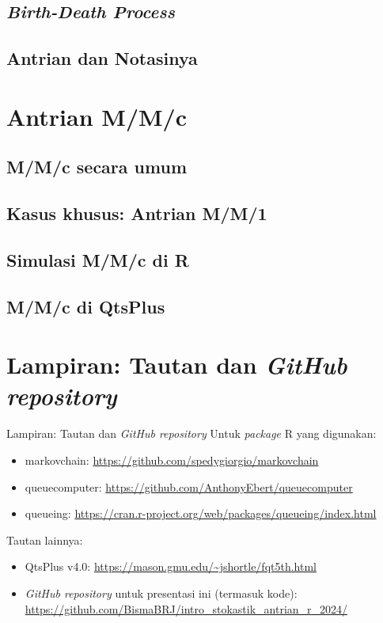 \documentclass{beamer}
\begin{document}
\subsection{\textit{Birth-Death Process}}

\subsection{Antrian dan Notasinya}

\section{Antrian M/M/c}

\subsection{M/M/c secara umum}

\subsection{Kasus khusus: Antrian M/M/1}

\subsection{Simulasi M/M/c di R}

\subsection{M/M/c di QtsPlus}

\section{Lampiran: Tautan dan \textit{GitHub repository}}

\begin{frame}{Lampiran: Tautan dan \textit{GitHub repository}}
    Untuk \textit{package} R yang digunakan:
    \begin{itemize}
        \item markovchain: \url{https://github.com/spedygiorgio/markovchain}

        \item queuecomputer: \url{https://github.com/AnthonyEbert/queuecomputer}
        
        \item queueing: \url{https://cran.r-project.org/web/packages/queueing/index.html}
    \end{itemize}

    Tautan lainnya:

    \begin{itemize}
        \item QtsPlus v4.0: \url{https://mason.gmu.edu/~jshortle/fqt5th.html}
        
        \item \textit{GitHub repository} untuk presentasi ini (termasuk kode): \url{https://github.com/BismaBRJ/intro_stokastik_antrian_r_2024/}
    \end{itemize}
\end{frame}
\end{document}
